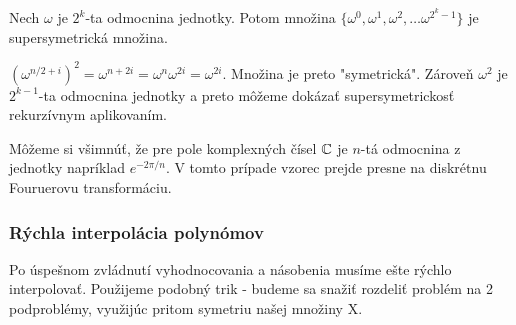 \begin{lema}
 Nech $\omega$ je $2^k$-ta odmocnina jednotky.
 Potom množina $\{\omega^0, \omega^1, \omega^2, \dots
 \omega^{2^k-1}\}$ je supersymetrická množina.
\end{lema}
\begin{dokaz}
 $(\omega^{n/2+i})^2 = \omega^{n+2i} = \omega^n \omega^{2i} =
 \omega^{2i}$. Množina je preto "symetrická". Zároveň
 $\omega^2$ je  $2^{k-1}$-ta odmocnina jednotky a preto
 môžeme dokázať supersymetrickosť rekurzívnym aplikovaním.
\end{dokaz}

\begin{poznamka}
    Môžeme si všimnúť, že pre pole komplexných čísel $\mathbb{C}$ je $n$-tá
    odmocnina z jednotky napríklad $e^{-2\pi/n}$. V tomto prípade
    vzorec \todo{} prejde presne na diskrétnu Fouruerovu
    transformáciu.
\end{poznamka}

\subsubsection{Rýchla interpolácia polynómov}
Po úspešnom zvládnutí vyhodnocovania a násobenia musíme ešte rýchlo
interpolovať. Použijeme podobný trik - budeme sa snažiť rozdeliť
problém na 2 podproblémy, využijúc pritom symetriu našej množiny X.

